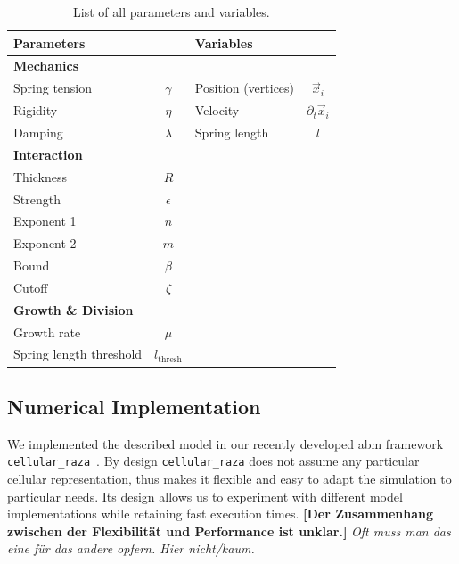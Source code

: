 \documentclass[10pt,letterpaper]{article}
\begin{document}
\begin{table}
    \centering
    \def\arraystretch{1.3}
    \begin{tabular}{l c l c}
        \textbf{Parameters} && \textbf{Variables}\\
        \toprule
        \multicolumn{4}{l}{\textbf{Mechanics}}\\
        \midrule
        Spring tension & $\gamma$ & Position (vertices) & $\vec{x}_i$\\
        Rigidity & $\eta$ & Velocity & $\partial_t\vec{x}_i$\\
        Damping & $\lambda$ & Spring length & $l$ \\
        \multicolumn{4}{l}{\textbf{Interaction}}\\
        \midrule
        Thickness & $R$\\
        Strength & $\epsilon$\\
        Exponent 1 & $n$\\
        Exponent 2 & $m$\\
        Bound & $\beta$\\
        Cutoff & $\zeta$\\
        \multicolumn{4}{l}{\textbf{Growth \& Division}}\\
        \midrule
        Growth rate & $\mu$\\
        Spring length threshold & $l_\text{thresh}$\\
        \bottomrule
    \end{tabular}
    \caption{
        List of all parameters and variables.
    }
    \label{table:list-of-parameters}
\end{table}

\subsection{Numerical Implementation}

We implemented the described model in our recently developed \ac{abm} framework
\texttt{cellular\_raza}~\cite{Pleyer2025}.
By design \texttt{cellular\_raza} does not assume any particular cellular representation, thus makes
it flexible and easy to adapt the simulation to particular needs.
Its design allows us to experiment with different model implementations while retaining fast
execution times.
\textbf{[Der Zusammenhang zwischen der Flexibilität und Performance ist unklar.]}
\textit{Oft muss man das eine für das andere opfern. Hier nicht/kaum.}
\end{document}
